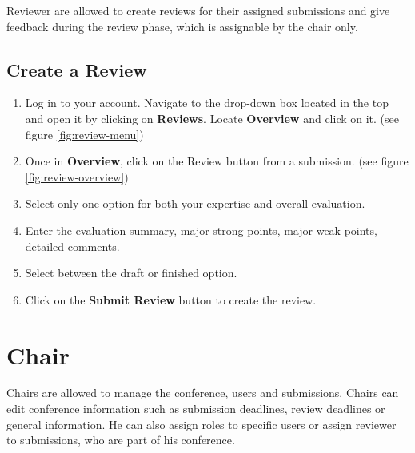 \documentclass[nochapterpage,nopartpage,noheadingspace,numbersubsubsec,bigchapter,colorback,accentcolor=tud9c,10pt]{tudreport}
\begin{document}
Reviewer are allowed to create reviews for their assigned submissions and give feedback during the review phase, which is assignable by the chair only.

	\section{Create a Review}


\begin{enumerate}
	\item	Log in to your account. Navigate to the drop-down box located in the top and open it by clicking on \textbf{Reviews}. Locate \textbf{Overview} and click on it. (see figure \ref{fig:review-menu})
	\item	Once in \textbf{Overview}, click on the {Review} button from a submission. (see figure \ref{fig:review-overview})
	\item	Select only one option for both your expertise and overall evaluation.
	\item	Enter the evaluation summary, major strong points, major weak points, detailed comments.
	\item	Select between the draft or finished option.
	\item	Click on the \textbf{Submit Review} button to create the review.
\end{enumerate}


  \chapter{Chair}

Chairs are allowed to manage the conference, users and submissions. Chairs can edit conference information such as submission deadlines, review deadlines or general information. He can also assign roles to specific users or assign reviewer to submissions, who are part of his conference. 
\end{document}
